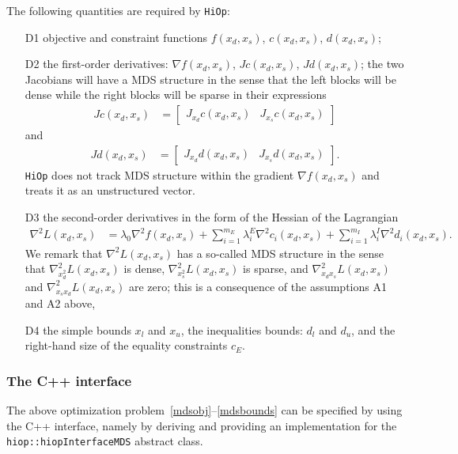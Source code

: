 \documentclass[11pt]{article}
\newcommand{\Hi}{\texttt{HiOp}\xspace}
\begin{document}
The following quantities are required by \Hi:
\begin{itemize}
\item[D1] objective and constraint functions $f(x_d,x_s)$, $c(x_d,x_s)$, $d(x_d,x_s)$;
\item[D2] the first-order derivatives: $\nabla f(x_d,x_s)$, $Jc(x_d,x_s)$, $Jd(x_d,x_s)$; the two Jacobians will have a MDS structure in the sense that the left blocks will be dense while the right blocks will be sparse in their expressions
\begin{align}
Jc(x_d,x_s) &= \left[\begin{array}{cc} J_{x_d} c(x_d,x_s) &  J_{x_s} c(x_d,x_s)\end{array}\right] 
\end{align}
and
\begin{align}
Jd(x_d,x_s) &= \left[\begin{array}{cc} J_{x_d} d(x_d,x_s) &  J_{x_s} d(x_d,x_s)\end{array}\right]. \label{mdsJac}
\end{align}
\Hi does not track MDS structure within the gradient $\nabla f(x_d,x_s)$ and treats it as an unstructured vector.
\item[D3] the second-order derivatives in the form of the Hessian of the Lagrangian
\begin{align}
\nabla^2 L(x_d,x_s)& = \lambda_0 \nabla^2 f(x_d,x_s) + \sum_{i=1}^{m_E} \lambda_i^E \nabla^2 c_i(x_d,x_s) + \sum_{i=1}^{m_I} \lambda_i^I \nabla^2 d_i(x_d,x_s).\label{mdsHess}
\end{align}
We remark that  $\nabla^2 L(x_d,x_s)$ has a so-called MDS structure in the sense that $\nabla^2_{x_d^2} L(x_d,x_s)$ is dense, $\nabla^2_{x_s^2} L(x_d,x_s)$ is sparse, and $\nabla^2_{x_d x_s} L(x_d,x_s)$ and $\nabla^2_{x_s x_d} L(x_d,x_s)$ are zero; this is a consequence of the assumptions A1 and A2 above,

\item[D4] the simple bounds $x_l$ and $x_u$, the inequalities bounds: $d_l$ and $d_u$, and the right-hand size of the equality constraints $c_E$.
\end{itemize}

\subsubsection{The C++ interface}\label{sec:mds:cpp}
The above optimization problem~\eqref{mdsobj}--\eqref{mdsbounds} can be specified by using the C++ interface, namely by deriving and providing an implementation for the \texttt{hiop::hiopInterfaceMDS} abstract class.
\end{document}
